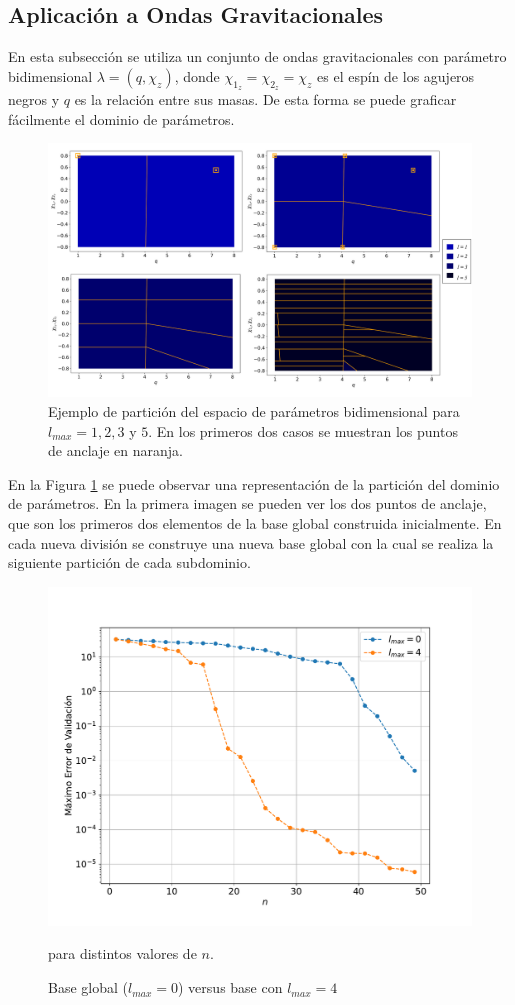 \subsection{Aplicación a Ondas Gravitacionales}
\label{sec:hp-gw}

En esta subsección se utiliza un conjunto de ondas gravitacionales con parámetro bidimensional $\lambda = (q, \chi_z)$, donde $\chi_{1_z} = \chi_{2_z} = \chi_z$ es el espín de los agujeros negros y $q$ es la relación entre sus masas. De esta forma se puede graficar fácilmente el dominio de parámetros.

\begin{figure}[h!]
\centering
\includegraphics[width=1\columnwidth]{figs/particion2d.png}
\caption{Ejemplo de partición del espacio de parámetros bidimensional para $l_{max}= 1, 2, 3$ y $5$. En los primeros dos casos se muestran los puntos de anclaje en naranja.}
\label{fig:part1}
\end{figure}

En la Figura \ref{fig:part1} se puede observar una representación de la partición del dominio de parámetros. En la primera imagen se pueden ver los dos puntos de anclaje, que son los primeros dos elementos de la base global construida inicialmente. En cada nueva división se construye una nueva base global con la cual se realiza la siguiente partición de cada subdominio.

\begin{figure}[h!]
\centering
\includegraphics[width=.8\columnwidth, trim={0, 1.3cm, 0, 1.4cm}]{figs/l0vsl4.pdf}
\caption{Base global ($l_{max} = 0$) versus base con $l_{max} = 4$} para distintos valores de $n$.
\label{fig:l0vl4}
\end{figure}


